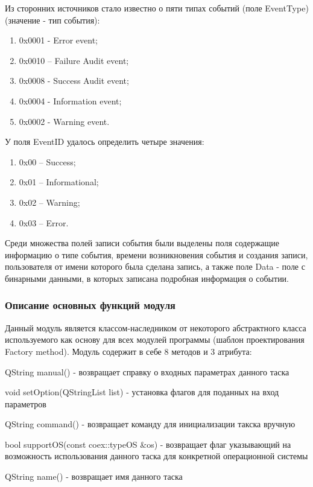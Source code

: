 Из сторонних источников \cite{evt} стало известно о пяти типах событий (поле EventType) (значение - тип события):

\begin{enumerate}
\item 0x0001 - Error event;
\item 0x0010 – Failure Audit event;
\item 0x0008 - Success Audit event;
\item 0x0004 - Information event;
\item 0x0002 - Warning event.
\end{enumerate}

У поля EventID удалось определить четыре значения:

\begin{enumerate}
\item 0x00 – Success;
\item 0x01 – Informational;
\item 0x02 – Warning;
\item 0x03 – Error.
\end{enumerate}

Среди множества полей записи события были выделены поля содержащие информацию о типе события, времени возникновения события и создания записи, пользователя от имени которого была сделана запись, а также поле Data - поле с бинарными данными, в которых записана подробная информация о событии.

\subsubsection{Описание основных функций модуля}

Данный модуль является классом-наследником от некоторого абстрактного класса используемого как основу для всех модулей программы (шаблон проектирования Factory method). Модуль содержит в себе 8 методов и 3 атрибута:

QString manual() - возвращает справку о входных параметрах данного таска

void setOption(QStringList list) - установка флагов для поданных на вход параметров

QString command() - возвращает команду для инициализации такска вручную

bool supportOS(const coex::typeOS \&os) - возвращает флаг указывающий на возможность использования данного таска для конкретной операционной системы

QString name() - возвращает имя данного таска

